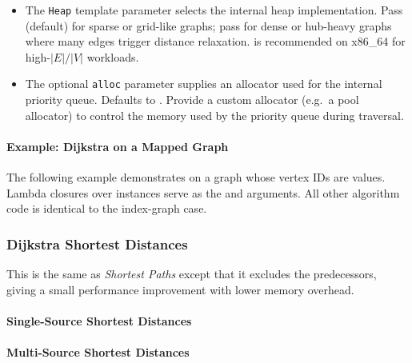 \begin{itemdescr}
\begin{itemize}
                        is not needed (avoids storing results).
                  \item The \lstinline{Heap} template parameter selects the internal heap implementation.
                        Pass  (default) for sparse or grid-like graphs;
                        pass  for dense or hub-heavy graphs
                        where many edges trigger distance relaxation.
                         is recommended on x86\_64 for high-$|E|/|V|$ workloads.
                  \item The optional \lstinline{alloc} parameter supplies an allocator used for
                        the internal priority queue.  Defaults to .
                        Provide a custom allocator (e.g.~a pool allocator) to control the memory
                        used by the priority queue during traversal.
            \end{itemize}
\end{itemdescr}

\paragraph{Example: Dijkstra on a Mapped Graph}
The following example demonstrates  on a graph whose
vertex IDs are  values.  Lambda closures over 
instances serve as the  and  arguments.  All other
algorithm code is identical to the index-graph case.
{\small
      
}

\subsubsection{Dijkstra Shortest Distances}
This is the same as \textit{Shortest Paths} except that it excludes the predecessors,
giving a small performance improvement with lower memory overhead.

\paragraph{Single-Source Shortest Distances}
{\small
      
}

\paragraph{Multi-Source Shortest Distances}
{\small
      
}

